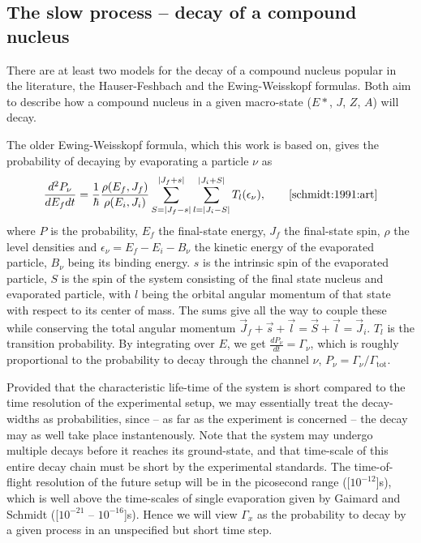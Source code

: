 \subsection{The slow process -- decay of a compound nucleus}
There are at least two models for the decay of a compound nucleus popular in the literature, the Hauser-Feshbach and the Ewing-Weisskopf formulas. Both aim to describe how a compound nucleus in a given macro-state ($E*$, $J$, $Z$, $A$) will decay.

The older Ewing-Weisskopf formula, which this work is based on, gives the probability of decaying by evaporating a particle $\nu$ as
\begin{equation}
\frac{d^2 P_\nu}{dE_f dt} = \frac{1}{\hbar} \frac{\rho(E_f,J_f)}{\rho(E_i,J_i)} \sum_{S=|J_f-s|}^{|J_f+s|}\sum_{l=|J_i-S|}^{|J_i+S|} T_l(\epsilon_\nu),\qquad\cite{schmidt:1991:art}\label{eq:ew}
\end{equation}
where $P$ is the probability, $E_f$ the final-state energy, $J_f$ the final-state spin, $\rho$ the level densities and $\epsilon_\nu = E_f-E_i-B_\nu$ the kinetic energy of the evaporated particle, $B_\nu$ being its binding energy. 
$s$ is the intrinsic spin of the evaporated particle, $S$ is the spin of the system consisting of the final state nucleus and evaporated particle, with $l$ being the orbital angular momentum of that state with respect to its center of mass. The sums give all the way to couple these while conserving the total angular momentum $\vec{J}_f+\vec{s} +\vec{l}= \vec{S} +\vec{l}= \vec{J}_i$. $T_l$ is the transition probability.
By integrating over $E$, we get $\frac{d P_\nu}{dt} = \Gamma_\nu$, which is roughly proportional to the probability to decay through the channel $\nu$, $P_\nu = \Gamma_\nu/\Gamma_{\text{tot}}$. 

Provided that the characteristic life-time of the system is short compared to the time resolution of the experimental setup, we may essentially treat the decay-widths as probabilities, since -- as far as the experiment is concerned -- the decay may as well take place instantenously. Note that the system may undergo multiple decays before it reaches its ground-state, and that time-scale of this entire decay chain must be short by the experimental standards. The time-of-flight resolution of the future \rtb{} setup will be in the picosecond range (\unit[$10^{-12}$]{s})\cite{r3b:online}, which is well above the time-scales of single evaporation given by Gaimard and Schmidt (\unit[$10^{-21}$ -- $10^{-16}$]{s})\cite{gaimard:1991:art}. Hence we will view $\Gamma_x$ as the probability to decay by a given process in an unspecified but short time step.

